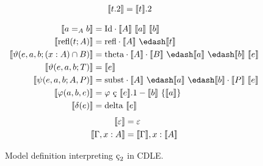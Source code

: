 \begin{figure}
\begin{minipage}{0.5\textwidth}
\begin{align*}
            \llbracket t.2 \rrbracket &= \llbracket t \rrbracket.2
        \end{align*}
    \end{minipage}
    \begin{align*}
        \sema{a =_A b} &= \cId \cdot \sema{A}\ \sema{a}\ \sema{b} \\
        \sema{\text{refl}(t; A)} &= \crefl \cdot \sema{A}\ \edash \sema{t} \\
        \sema{\vartheta(e, a, b; (x : A) \cap B)} &= \ctheta \cdot \sema{A} \cdot \sema{B}\ \edash \sema{a}\ \edash \sema{b}\ \sema{e} \\
        \sema{\vartheta(e, a, b; T)} &= \sema{e} \\
        \sema{\psi(e, a, b; A, P)} &= \csubst  \cdot \sema{A}\ \edash \sema{a}\ \edash \sema{b} \cdot \sema{P}\ \sema{e} \\
        \sema{\varphi(a, b, e)} &= \varphi\ \text{\c{c}}\ \sema{e}.1 - \sema{b}\ \{ \sema{a} \} \\
        \sema{\delta(e)} &= \cdelta\ \sema{e}
    \end{align*}
    \begin{align*}
        \llbracket \varepsilon \rrbracket &= \varepsilon \\
        \llbracket \Gamma, x : A \rrbracket &= \llbracket \Gamma \rrbracket, x : \llbracket A \rrbracket
    \end{align*}
    \caption{
        Model definition interpreting $\ced$ in CDLE.
    }
    \label{fig:4:model}
\end{figure}


